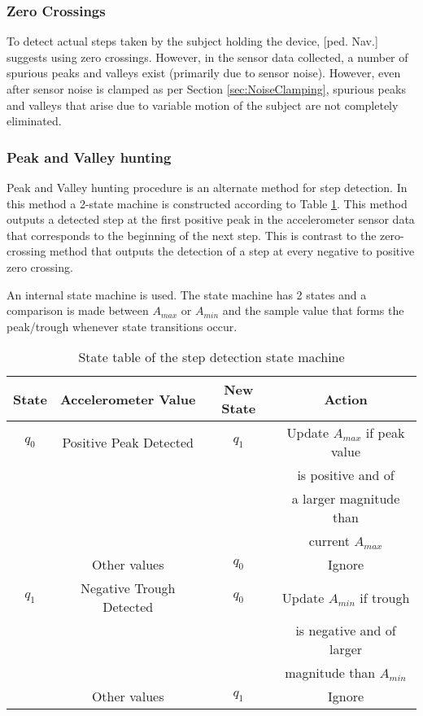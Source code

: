 \subsubsection{Zero Crossings}

To detect actual steps taken by the subject holding the device, [ped. Nav.] 
suggests using zero crossings. However, in the sensor data collected, a number
of spurious peaks and valleys exist (primarily due to sensor noise). However, 
even after sensor noise is clamped as per Section \ref{sec:NoiseClamping}, 
spurious peaks and valleys that arise due to variable motion of the subject 
are not completely eliminated.

\subsubsection{Peak and Valley hunting}

Peak and Valley hunting procedure is an alternate method for step detection.
In this method a 2-state machine is constructed according to Table
\ref{tbl:peak_valley_state_table}. This method outputs a detected step at 
the first positive peak in the accelerometer sensor data that corresponds to 
the beginning of the next step. This is contrast to the zero-crossing method 
that outputs the detection of a step at every negative to positive zero 
crossing. 


An internal state machine is used. The state machine has 2 states and a comparison
is made between $A_{max}$ or $A_{min}$ and the sample value that forms the peak/trough
whenever state transitions occur.

\begin{table}[h]\centering
    \caption{State table of the step detection state machine\label{tbl:peak_valley_state_table}}
    \begin{tabular}{cccc} \hline
    State & Accelerometer Value     & New State &  Action\\     \hline
    $q_0$ & Positive Peak Detected  & $q_1$     & Update $A_{max}$ if peak value  \\ 
          &                         &           & is positive and of \\
          &                         &           & a larger magnitude than \\
          &                         &           & current $A_{max}$ \\
          & Other values            & $q_0$     & Ignore \\         \hline
    $q_1$ & Negative Trough Detected & $q_0$    & Update $A_{min}$ if trough \\
          &                         &           & is negative and of larger \\ 
          &                         &           & magnitude than $A_{min}$ \\
          & Other values            & $q_1$     & Ignore \\ \hline
    \end{tabular}
\end{table}
